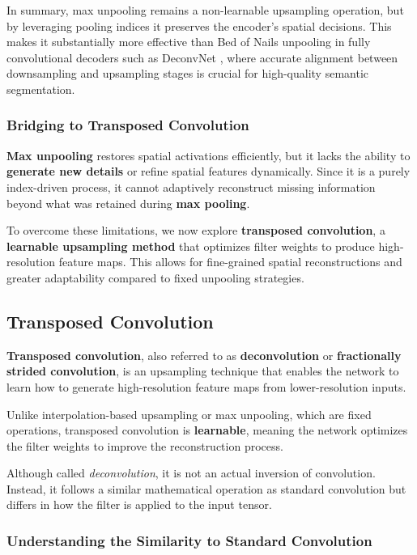 \noindent
In summary, max unpooling remains a non-learnable upsampling operation, but by leveraging pooling indices it preserves the encoder’s spatial decisions. This makes it substantially more effective than Bed of Nails unpooling in fully convolutional decoders such as DeconvNet \cite{noh2015_deconvnet}, where accurate alignment between downsampling and upsampling stages is crucial for high-quality semantic segmentation.

\subsubsection{Bridging to Transposed Convolution}

\noindent \textbf{Max unpooling} restores spatial activations efficiently, but it lacks the ability to \textbf{generate new details} or refine spatial features dynamically. Since it is a purely index-driven process, it cannot adaptively reconstruct missing information beyond what was retained during \textbf{max pooling}.

\noindent To overcome these limitations, we now explore \textbf{transposed convolution}, a \textbf{learnable upsampling method} that optimizes filter weights to produce high-resolution feature maps. This allows for fine-grained spatial reconstructions and greater adaptability compared to fixed unpooling strategies.

\subsection{Transposed Convolution}
\label{chapter15_subsec:transposed_convolution}

\noindent \textbf{Transposed convolution}, also referred to as \textbf{deconvolution} or \textbf{fractionally strided convolution}, is an upsampling technique that enables the network to learn how to generate high-resolution feature maps from lower-resolution inputs. 

Unlike interpolation-based upsampling or max unpooling, which are fixed operations, transposed convolution is \textbf{learnable}, meaning the network optimizes the filter weights to improve the reconstruction process.

\noindent Although called \textit{deconvolution}, it is not an actual inversion of convolution. Instead, it follows a similar mathematical operation as standard convolution but differs in how the filter is applied to the input tensor.

\subsubsection{Understanding the Similarity to Standard Convolution}


